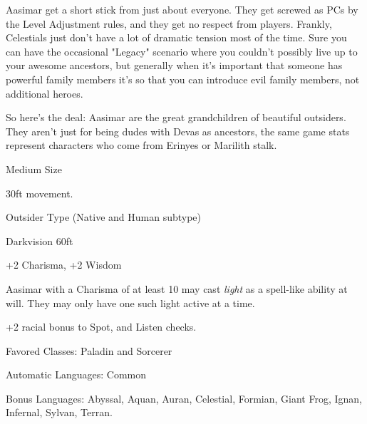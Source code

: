 
Aasimar get a short stick from just about everyone. They get screwed as PCs by the Level Adjustment rules, and they get no respect from players. Frankly, Celestials just don't have a lot of dramatic tension most of the time. Sure you can have the occasional "Legacy" scenario where you couldn't possibly live up to your awesome ancestors, but generally when it's important that someone has powerful family members it's so that you can introduce evil family members, not additional heroes.

So here's the deal: Aasimar are the great grandchildren of beautiful outsiders. They aren't just for being dudes with Devas as ancestors, the same game stats represent characters who come from Erinyes or Marilith stalk. 

\begin{itemize*}
\item Medium Size
\item 30ft movement.
\item Outsider Type (Native and Human subtype)
\item Darkvision 60ft
\item +2 Charisma, +2 Wisdom
\item Aasimar with a Charisma of at least 10 may cast \textit{light} as a spell-like ability at will. They may only have one such light active at a time.
\item +2 racial bonus to Spot, and Listen checks.
\item Favored Classes: Paladin and Sorcerer
\item Automatic Languages: Common
\item Bonus Languages: Abyssal, Aquan, Auran, Celestial, Formian, Giant Frog, Ignan, Infernal, Sylvan, Terran. 
\end{itemize*}

